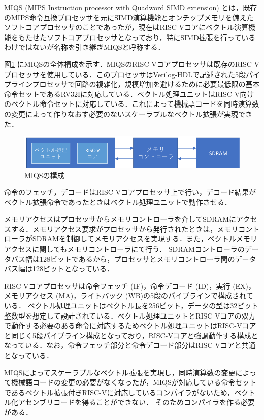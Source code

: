 MIQS (MIPS Instruction processor with Quadword SIMD extension)\cite{bib:hiraishi}
とは，既存のMIPS命令互換プロセッサを元にSIMD演算機能とオンチップメモリを備えたソフトコアプロセッサのことであったが，現在はRISC-Vコアにベクトル演算機能をもたせたソフトコアプロセッサとなっており，特にSIMD拡張を行っているわけではないが名称を引き継ぎMIQSと呼称する．

図\ref{fig:MIQS_system}
にMIQSの全体構成を示す．MIQSのRISC-Vコアプロセッサは既存のRISC-Vプロセッサを使用している．このプロセッサはVerilog-HDLで記述された5段パイプラインプロセッサで回路の複雑化，規模増加を避けるために必要最低限の基本命令セットであるRV32Iに対応している．ベクトル処理ユニットはRISC-V向けのベクトル命令セットに対応している．これによって機械語コードを同時演算数の変更によって作りなおす必要のないスケーラブルなベクトル拡張が実現できた．

\begin{figure}[b]
\begin{center}
    \includegraphics[scale=1.0]{image/MIQS_system.pdf}
    \caption{MIQSの構成}
    \label{fig:MIQS_system}
\end{center}
\end{figure}

命令のフェッチ，デコードはRISC-Vコアプロセッサ上で行い，デコード結果がベクトル拡張命令であったときはベクトル処理ユニットで動作させる．

メモリアクセスはプロセッサからメモリコントローラを介してSDRAMにアクセスする．メモリアクセス要求がプロセッサから発行されたときは，メモリコントローラがSDRAMを制御してメモリアクセスを実現する．また，ベクトルメモリアクセスに関してもメモリコントローラにて行う．
SDRAMコントローラのデータバス幅は128ビットであるから，プロセッサとメモリコントローラ間のデータバス幅は128ビットとなっている．

RISC-Vコアプロセッサは命令フェッチ (IF)，命令デコード (ID)，実行 (EX)，メモリアクセス (MA)，ライトバック (WB)の5段のパイプラインで構成されている．
ベクトル処理ユニットはベクトル長を256ビット，データの型は32ビット整数型を想定して設計されている．ベクトル処理ユニットとRISC-Vコアの双方で動作する必要のある命令に対応するためベクトル処理ユニットはRISC-Vコアと同じく5段パイプライン構成となっており，RISC-Vコアと強調動作する構成となっている．なお，命令フェッチ部分と命令デコード部分はRISC-Vコアと共通となっている．

MIQSによってスケーラブルなベクトル拡張を実現し，同時演算数の変更によって機械語コードの変更の必要がなくなったが，MIQSが対応している命令セットであるベクトル拡張付きRISC-Vに対応しているコンパイラがないため，ベクトル化アセンブリコードを得ることができない．
そのためコンパイラを作る必要がある．
